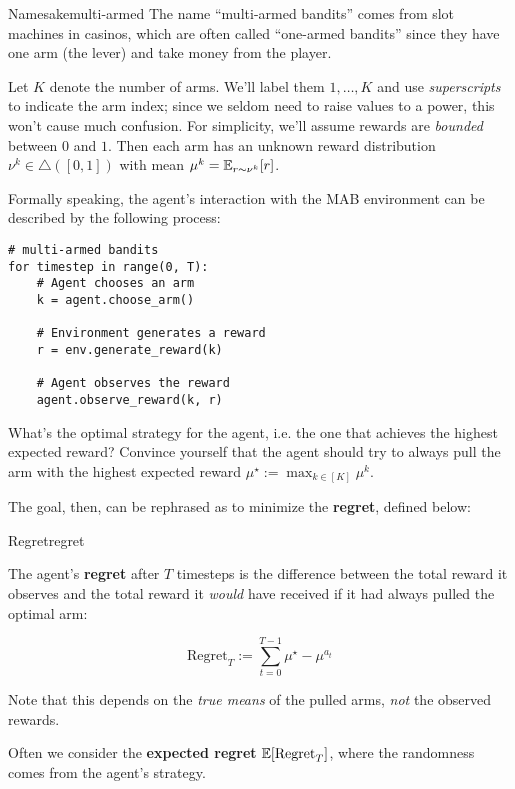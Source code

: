 \documentclass[../main/main]{subfiles}
\begin{document}
\begin{remark}{Namesake}{multi-armed}
    The name ``multi-armed bandits'' comes from slot machines in casinos, which are often called ``one-armed bandits'' since they have one arm (the lever) and take money from the player.
\end{remark}

Let $K$ denote the number of arms. We'll label them $1, \dots, K$ and use \emph{superscripts} to indicate the arm index; since we seldom need to raise values to a power, this won't cause much confusion. For simplicity, we'll assume rewards are \emph{bounded} between $0$ and $1$. Then each arm has an unknown reward distribution $\nu^k \in \triangle([0, 1])$ with mean $\mu^k = \operatorname*{\mathbb{E}}_{r \sim \nu^k} [r]$.

Formally speaking, the agent's interaction with the MAB environment can be described by the following process:

\begin{lstlisting}
# multi-armed bandits
for timestep in range(0, T):
    # Agent chooses an arm
    k = agent.choose_arm()
    
    # Environment generates a reward
    r = env.generate_reward(k)
    
    # Agent observes the reward
    agent.observe_reward(k, r)
\end{lstlisting}


What's the optimal strategy for the agent, i.e. the one that achieves the highest expected reward? Convince yourself that the agent should try to always pull the arm with the highest expected reward $\mu^\star := \max_{k \in [K]} \mu^k$.

The goal, then, can be rephrased as to minimize the \textbf{regret}, defined below:

\begin{definition}{Regret}{regret}
    
The agent's \textbf{regret} after $T$ timesteps is the difference between the total reward it observes and the total reward it \emph{would} have received if it had always pulled the optimal arm:

\begin{equation}
    \text{Regret}_T := \sum_{t=0}^{T-1} \mu^\star - \mu^{a_t}
\end{equation}

Note that this depends on the \emph{true means} of the pulled arms, \emph{not} the observed rewards.

Often we consider the \textbf{expected regret} $\operatorname*{\mathbb{E}}[\text{Regret}_T]$, where the randomness comes from the agent's strategy.

\end{definition}
\end{document}
